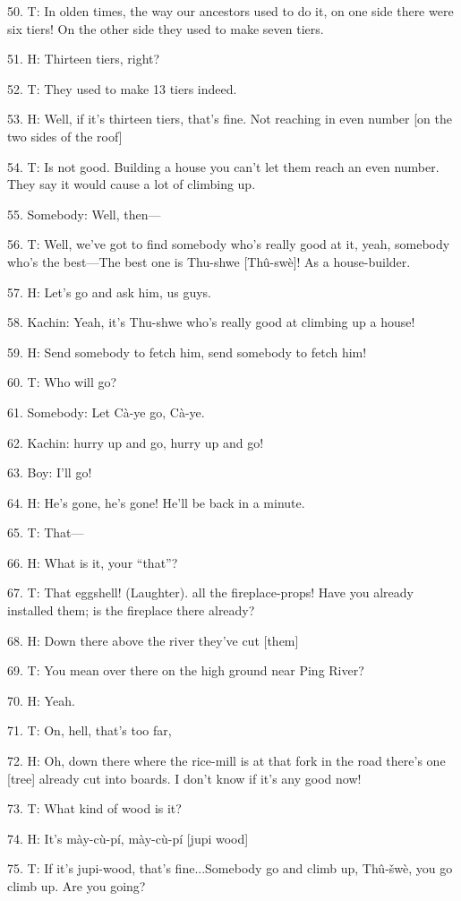 50. T: In olden times, the way our ancestors used to do it, on one side there were
six tiers!  On the other side they used to make seven tiers.

51. H: Thirteen tiers, right?

52. T: They used to make 13 tiers indeed.

53. H: Well, if it's thirteen tiers, that's fine.  Not reaching in even number
[on the two sides of the roof]

54. T: Is not good.  Building a house you can't let them reach an even number.
They say it would cause a lot of climbing up.

55. Somebody: Well, then---

56. T: Well, we've got to find somebody who's really good at it, yeah, somebody
who's the best---The best one is Thu-shwe [Thû-swè]!  As a house-builder.

57. H: Let's go and ask him, us guys.

58. Kachin: Yeah, it's Thu-shwe who's really good at climbing up a house!

59. H: Send somebody to fetch him, send somebody to fetch him!

60. T: Who will go?

61. Somebody: Let Cà-ye go, Cà-ye.

62. Kachin: hurry up and go, hurry up and go!

63. Boy: I'll go!

64. H: He's gone, he's gone!  He'll be back in a minute.

65. T: That---

66. H: What is it, your ``that''?

67. T: That eggshell! (Laughter). all the fireplace-props!  Have you already installed
them; is the fireplace there already?

68. H: Down there above the river they've cut [them]

69. T: You mean over there on the high ground near Ping River?

70. H: Yeah.

71. T: On, hell, that's too far,

72. H: Oh, down there where the rice-mill is at that fork in the road there's one
[tree] already cut into boards.  I don't know if it's any good now!

73. T: What kind of wood is it?

74. H: It's mày-cù-pí, mày-cù-pí [jupi wood]

75. T: If it's jupi-wood, that's fine...Somebody go and climb up, Thû-šwè, you
go climb up.  Are you going?

